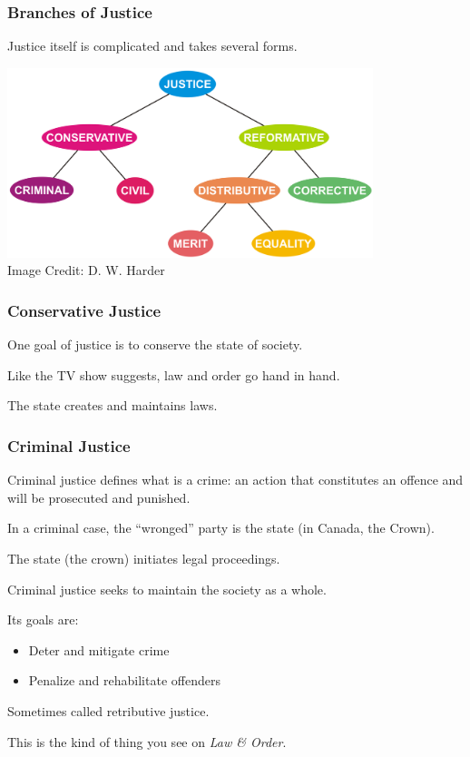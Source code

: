 \begin{frame}
\frametitle{Branches of Justice}

Justice itself is complicated and takes several forms.

\begin{center}
\includegraphics[width=0.8\textwidth]{images/justice-branches.png}\\
{\scriptsize Image Credit: D. W. Harder}
\end{center}


\end{frame}



\begin{frame}
\frametitle{Conservative Justice}

One goal of justice is to \alert{conserve} the state of society.

Like the TV show suggests, law and order go hand in hand.

The state creates and maintains laws.

\end{frame}



\begin{frame}
\frametitle{Criminal Justice}

Criminal justice defines what is a crime: an action that constitutes an offence and will be prosecuted and punished.

In a criminal case, the ``wronged'' party is the state (in Canada, the Crown).

The state (the crown) initiates legal proceedings.

Criminal justice seeks to maintain the society as a whole.

Its goals are:
\begin{itemize}
\item Deter and mitigate crime
\item Penalize and rehabilitate offenders
\end{itemize}

Sometimes called retributive justice.

This is the kind of thing you see on \textit{Law \& Order}.

\end{frame}



